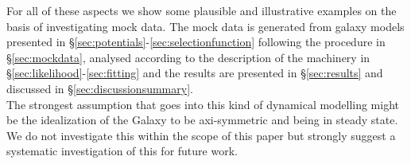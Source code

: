 For all of these aspects we show some plausible and illustrative examples on the basis of investigating mock data. The mock data is generated from galaxy models presented in \S\ref{sec:potentials}-\ref{sec:selectionfunction} following the procedure in \S\ref{sec:mockdata}, analysed according to the description of the machinery in \S\ref{sec:likelihood}-\ref{sec:fitting} and the results are presented in \S\ref{sec:results} and discussed in \S\ref{sec:discussionsummary}.\\

The strongest assumption that goes into this kind of dynamical modelling might be the idealization of the Galaxy to be axi-symmetric and being in steady state. We do not investigate this within the scope of this paper but strongly suggest a systematic investigation of this for future work.

